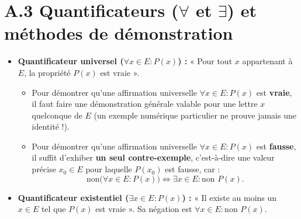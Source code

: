 \section*{A.3 Quantificateurs ($\forall$ et $\exists$) et méthodes de démonstration}

\begin{itemize}
    \item \textbf{Quantificateur universel ($\forall x \in E : P(x)$) :} « Pour tout $x$ appartenant à $E$, la propriété $P(x)$ est vraie ».
    \begin{itemize}
        \item Pour démontrer qu'une affirmation universelle $\forall x \in E : P(x)$ est \textbf{vraie}, il faut faire une démonstration générale valable pour une lettre $x$ quelconque de $E$ (un exemple numérique particulier ne prouve jamais une identité !).
        \item Pour démontrer qu'une affirmation universelle $\forall x \in E : P(x)$ est \textbf{fausse}, il suffit d'exhiber \textbf{un seul contre-exemple}, c'est-à-dire une valeur précise $x_0 \in E$ pour laquelle $P(x_0)$ est fausse, car :
        \[
            \text{non}\bigl(\forall x \in E : P(x)\bigr) \iff \exists x \in E : \text{non } P(x).
        \]
    \end{itemize}
    \item \textbf{Quantificateur existentiel ($\exists x \in E : P(x)$) :} « Il existe au moins un $x \in E$ tel que $P(x)$ est vraie ». Sa négation est $\forall x \in E : \text{non } P(x)$.
\end{itemize}

